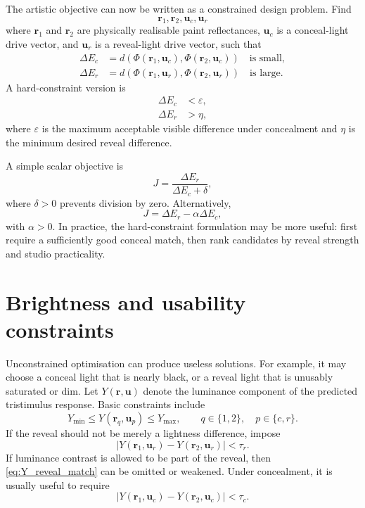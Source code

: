 \documentclass[11pt,a4paper]{article}
\newcommand{\vect}[1]{\boldsymbol{#1}}
\newcommand{\DE}{\Delta E}
\begin{document}
The artistic objective can now be written as a constrained design problem. Find
\begin{equation}
 \vect{r}_1,\vect{r}_2,\vect{u}_{c},\vect{u}_{r}
\end{equation}
where $\vect{r}_1$ and $\vect{r}_2$ are physically realisable paint reflectances, $\vect{u}_{c}$ is a conceal-light drive vector, and $\vect{u}_{r}$ is a reveal-light drive vector, such that
\begin{align}
 \DE_c &= d\!\left(\Phi(\vect{r}_1,\vect{u}_{c}),\Phi(\vect{r}_2,\vect{u}_{c})\right) \quad \text{is small},\\
 \DE_r &= d\!\left(\Phi(\vect{r}_1,\vect{u}_{r}),\Phi(\vect{r}_2,\vect{u}_{r})\right) \quad \text{is large}.
\end{align}
A hard-constraint version is
\begin{align}
 \DE_c &< \varepsilon,\label{eq:de_c_constraint}\\
 \DE_r &> \eta,\label{eq:de_r_constraint}
\end{align}
where $\varepsilon$ is the maximum acceptable visible difference under concealment and $\eta$ is the minimum desired reveal difference.

A simple scalar objective is
\begin{equation}
 J=\frac{\DE_r}{\DE_c+\delta},
 \label{eq:ratio_score}
\end{equation}
where $\delta>0$ prevents division by zero. Alternatively,
\begin{equation}
 J=\DE_r-\alpha\DE_c,
 \label{eq:weighted_score}
\end{equation}
with $\alpha>0$. In practice, the hard-constraint formulation may be more useful: first require a sufficiently good conceal match, then rank candidates by reveal strength and studio practicality.

\section{Brightness and usability constraints}

Unconstrained optimisation can produce useless solutions. For example, it may choose a conceal light that is nearly black, or a reveal light that is unusably saturated or dim. Let $Y(\vect{r},\vect{u})$ denote the luminance component of the predicted tristimulus response. Basic constraints include
\begin{equation}
 Y_{\min}\le Y(\vect{r}_q,\vect{u}_p)\le Y_{\max},
 \qquad q\in\{1,2\},\quad p\in\{c,r\}.
 \label{eq:Y_bounds}
\end{equation}
If the reveal should not be merely a lightness difference, impose
\begin{equation}
 |Y(\vect{r}_1,\vect{u}_r)-Y(\vect{r}_2,\vect{u}_r)|<\tau_r.
 \label{eq:Y_reveal_match}
\end{equation}
If luminance contrast is allowed to be part of the reveal, then \cref{eq:Y_reveal_match} can be omitted or weakened. Under concealment, it is usually useful to require
\begin{equation}
 |Y(\vect{r}_1,\vect{u}_c)-Y(\vect{r}_2,\vect{u}_c)|<\tau_c.
 \label{eq:Y_conceal_match}
\end{equation}
\end{document}
